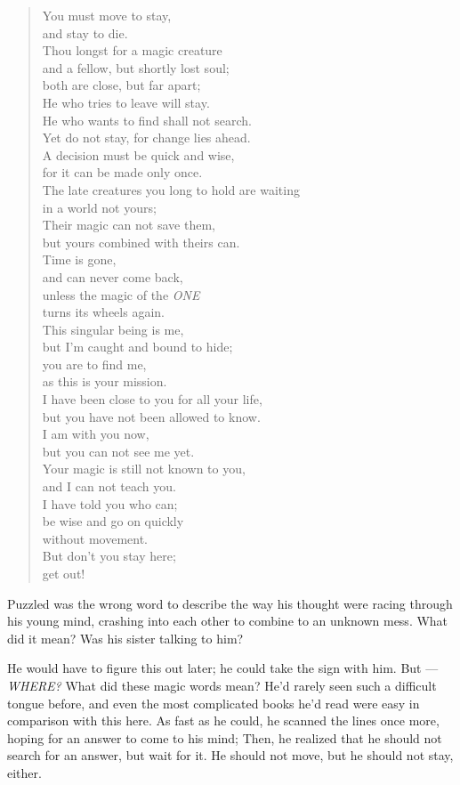 \begin{verse}
You must move to stay,\\
and stay to die.\\
Thou longst for a magic creature\\
and a fellow, but shortly lost soul;\\
both are close, but far apart;\\
He who tries to leave will stay.\\
He who wants to find shall not search.\\
Yet do not stay, for change lies ahead.\\
A decision must be quick and wise,\\
for it can be made only once.\\
The late creatures you long to hold are waiting\\
in a world not yours;\\
Their magic can not save them,\\
but yours combined with theirs can.\\
Time is gone,\\
and can never come back,\\
unless the magic of the \emph{ONE}\\
turns its wheels again.\\
This singular being is me,\\
but I'm caught and bound to hide;\\
you are to find me,\\
as this is your mission.\\
I have been close to you for all your life,\\
but you have not been allowed to know.\\
I am with you now,\\
but you can not see me yet.\\
Your magic is still not known to you,\\
and I can not teach you.\\
I have told you who can;\\
be wise and go on quickly\\
without movement.\\
But don't you stay here;\\
get out!
\end{verse}
Puzzled was the wrong word to describe the way his thought were racing through his young mind, crashing into each other to combine to an unknown mess. 
What did it mean? Was his sister talking to him?

He would have to figure this out later; he could take the sign with him. But --- \emph{WHERE?} 
What did these magic words mean? He'd rarely seen such a difficult tongue before, and even the most complicated books he'd read were easy in comparison with this here. 
As fast as he could, he scanned the lines once more, hoping for an answer to come to his mind; Then, he realized that he should not search for an answer, but wait for it. 
He should not move, but he should not stay, either.

